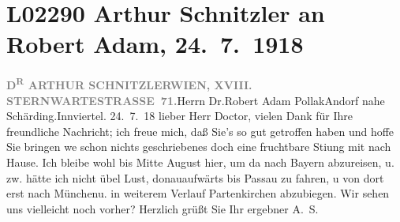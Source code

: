 

\section[Arthur Schnitzler an Robert Adam, 24. 7. 1918]{L02290 Arthur Schnitzler an Robert Adam, 24. 7. 1918}
\nopagebreak{}
\rehead{ }\normalsize\beginnumbering{}
\toendnotes[C]{\smallbreak\pagebreak[2]}
\pstart{}{\pb}\textcolor{gray}{\textbf{D\textsuperscript{R} ARTHUR SCHNITZLER}}\pend{}\pstart{}\textcolor{gray}{\textbf{WIEN, XVIII. STERNWARTESTRASSE 71.}}\pend{}{\bigskip}\pstart{}Herrn Dr.\pend{}\pstart{}Robert Adam Pollak\pend{}\pstart{}Andorf nahe Schärding.\pend{}\pstart{}Innviertel.\pend{}{\bigskip}\vspace{1em}
\pstart
           \raggedleft{}{\pb}24. 7. 18\pend
           \vspace{0.5em}
\pstart
           lieber Herr Doctor,  vielen Dank für Ihre freundliche Nachricht; ich
               freue mich, daß Sie’s so gut getroffen haben und hoffe Sie bringen we{\geminationn} schon nichts geschriebenes doch eine fruchtbare Sti{\geminationm}ung mit nach Hause. Ich bleibe wohl bis Mitte
                  August hier, um da{\geminationn} nach Bayern abzureisen, u. zw. hätte ich nicht übel Lust, donauaufwärts bis Passau zu fahren, u von dort erst nach Münchenu. in weiterem Verlauf Partenkirchen abzubiegen. Wir sehen uns vielleicht noch vorher? Herzlich
               grüßt Sie Ihr ergebner\pend
           \pstart \spacefill\mbox{A. S.}\pend{}\endnumbering{}  
      